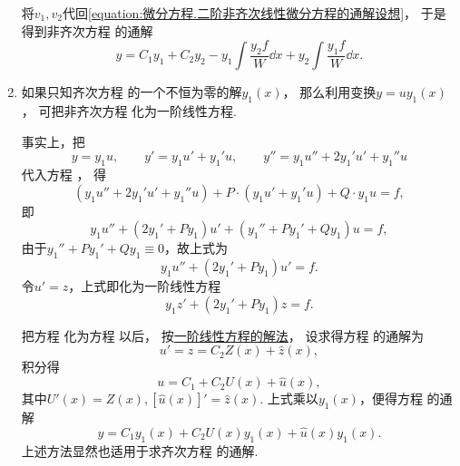 \begin{enumerate}
	将\(v_1,v_2\)代回\cref{equation:微分方程.二阶非齐次线性微分方程的通解设想}，
	于是得到非齐次方程  的通解
	\begin{equation}\label{equation:微分方程.二阶非齐次线性微分方程的通解.形式1}
		y = C_1 y_1 + C_2 y_2
		- y_1 \int \frac{y_2 f}{W} \dd{x}
		+ y_2 \int \frac{y_1 f}{W} \dd{x}.
	\end{equation}

	\item%
	如果只知齐次方程 
	的一个不恒为零的解\(y_1(x)\)，
	那么利用变换\(y = u y_1(x)\)，
	可把非齐次方程 
	化为一阶线性方程.

	事实上，把\[
		y = y_1 u, \qquad y' = y_1 u' + y_1' u, \qquad y'' = y_1 u'' + 2 y_1' u' + y_1'' u
	\]
	代入方程 ，
	得\[
		(y_1 u'' + 2y_1' u' + y_1'' u) + P\cdot(y_1 u' + y_1' u) + Q \cdot y_1 u = f,
	\]
	即\[
		y_1 u'' + (2y_1' + P y_1) u' + (y_1'' + P y_1' + Q y_1) u = f,
	\]
	由于\(y_1'' + P y_1' + Q y_1 \equiv 0\)，故上式为\[
		y_1 u'' + (2 y_1' + P y_1) u' = f.
	\]
	令\(u' = z\)，上式即化为一阶线性方程
	\begin{equation}\label{equation:微分方程.降为一阶的二阶线性微分方程}
		y_1 z' + (2 y_1' + P y_1) z = f.
	\end{equation}

	把方程 
	化为方程  以后，
	按\hyperref[section:微分方程.一阶线性微分方程]{一阶线性方程的解法}，
	设求得方程  的通解为\[
		u' = z = C_2 Z(x) + \hat{z}(x),
	\]
	积分得\[
		u = C_1 + C_2 U(x) + \hat{u}(x),
	\]
	其中\(U'(x) = Z(x), [\hat{u}(x)]' = \hat{z}(x)\).
	上式乘以\(y_1(x)\)，便得方程  的通解
	\begin{equation}\label{equation:微分方程.二阶非齐次线性微分方程的通解.形式2}
		y = C_1 y_1(x) + C_2 U(x) y_1(x) + \hat{u}(x) y_1(x).
	\end{equation}
	上述方法显然也适用于求齐次方程  的通解.
\end{enumerate}

